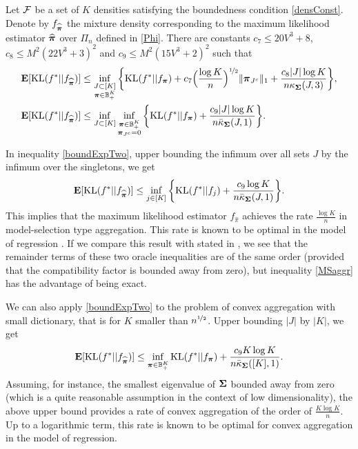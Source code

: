 \begin{theorem}
	\label{th:expectation}
	Let $\cal F$ be a set of $K$ densities satisfying the boundedness condition \eqref{densConst}.
	Denote by $f_{\widehat{\boldsymbol \pi}}$ the mixture density corresponding to the maximum likelihood estimator
	$\widehat{\boldsymbol \pi}$ over $\Pi_n$ defined in \eqref{Phi}. There are constants $c_7\le 20V^3 + 8$,
	$c_8\le M^2(22V^3+3)^2$ and $c_9\le M^2(15V^3+2)^2$ such that
	\begin{align}
	\mathbf E[{\rm KL}(f^*|| f_{\widehat{\boldsymbol \pi}})] &\leq \inf_{\substack{J\subset [K]\\ \boldsymbol \pi \in {\mathbb B}_+^K}}
	\bigg\{ {\rm KL}(f^*|| f_{\boldsymbol \pi}) + c_7\Big(\frac{\log K}{n}\Big)^{\nicefrac12} \|\boldsymbol \pi_{J^c}\|_1 +
	\frac{c_8|J|\log K}{n\kappa_{\boldsymbol\Sigma}(J,3)} \bigg\},\label{boundExpOne}\\
	\mathbf E[{\rm KL}(f^*|| f_{\widehat{\boldsymbol \pi}})] &\leq \inf_{J\subset [K]}\inf_{\substack{\boldsymbol \pi \in {\mathbb B}_+^K\\
			\boldsymbol \pi_{J^c}=0}} \bigg\{ {\rm KL}(f^*|| f_{\boldsymbol \pi}) +
	\frac{c_9|J|\log K}{n\bar\kappa_{\boldsymbol\Sigma}(J,1)} \bigg\}.\label{boundExpTwo}
	\end{align}
\end{theorem}

In inequality \eqref{boundExpTwo}, upper bounding the infimum over all sets $J$ by the infimum
over the singletons, we get
\begin{equation}
\mathbf E[{\rm KL}(f^*|| f_{\widehat{\boldsymbol \pi}})] \leq \inf_{j\in [K]}\bigg\{ {\rm KL}(f^*|| f_j) +
\frac{c_9\log K}{n\bar\kappa_{\boldsymbol\Sigma}(J,1)} \bigg\}.\label{MSaggr}
\end{equation}
This implies that the maximum likelihood estimator $f_{\hat\pi}$ achieves the
rate $\frac{\log K}{n}$ in model-selection type aggregation. This rate is known
to be optimal in the model of regression \citep{Rigollet12}. If we compare this result
with  stated in , we see that the remainder terms
of these two oracle inequalities are of the same order (provided that the compatibility
factor is bounded away from zero), but inequality \eqref{MSaggr} has the advantage
of being exact.

We can also apply  \eqref{boundExpTwo} to the problem of convex aggregation with
small dictionary, that is for $K$ smaller than  $n^{\nicefrac12}$. Upper bounding $|J|$ by $|K|$,
we get
\begin{equation}
\mathbf E[{\rm KL}(f^*|| f_{\widehat{\boldsymbol \pi}})] \leq \inf_{\boldsymbol \pi \in {\mathbb B}_+^K}
{\rm KL}(f^*|| f_{\boldsymbol \pi}) +\frac{c_9 K \log K}{n\bar\kappa_{\boldsymbol\Sigma}([K],1)}.
\label{Caggr}
\end{equation}
Assuming, for instance, the smallest eigenvalue of $\boldsymbol\Sigma$ bounded away from zero (which
is a quite reasonable assumption in the context of low dimensionality), the above upper
bound provides a rate of convex aggregation of the order of $\frac{K\log K}{n}$. Up to a
logarithmic term, this rate is known to be optimal for convex aggregation in the model of
regression.


